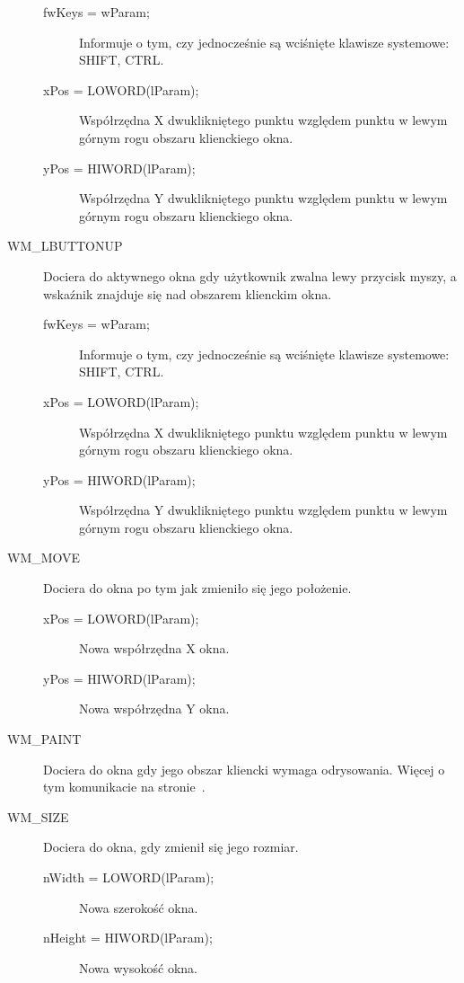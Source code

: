 \begin{description}
        \begin{description}
		\item[fwKeys = wParam;] Informuje o tym, czy jednocześnie są wciśnięte klawisze systemowe: SHIFT, CTRL.
		\item[xPos = LOWORD(lParam);] Współrzędna X dwuklikniętego punktu względem punktu w lewym górnym
			rogu obszaru klienckiego okna.
		\item[yPos = HIWORD(lParam);] Współrzędna Y dwuklikniętego punktu względem punktu w lewym górnym
			rogu obszaru klienckiego okna.
	\end{description}

\item[WM\_LBUTTONUP] Dociera do aktywnego okna gdy użytkownik zwalna lewy przycisk myszy, a wskaźnik znajduje
		się nad obszarem klienckim okna.

        \begin{description}
		\item[fwKeys = wParam;] Informuje o tym, czy jednocześnie są wciśnięte klawisze systemowe: SHIFT, CTRL.
		\item[xPos = LOWORD(lParam);] Współrzędna X dwuklikniętego punktu względem punktu w lewym górnym
			rogu obszaru klienckiego okna.
		\item[yPos = HIWORD(lParam);] Współrzędna Y dwuklikniętego punktu względem punktu w lewym górnym
			rogu obszaru klienckiego okna.
	\end{description}

\item[WM\_MOVE] Dociera do okna po tym jak zmieniło się jego położenie.

        \begin{description}
		\item[xPos = LOWORD(lParam);] Nowa współrzędna X okna.
		\item[yPos = HIWORD(lParam);] Nowa współrzędna Y okna.
	\end{description}

\item[WM\_PAINT] Dociera do okna gdy jego obszar kliencki wymaga odrysowania. Więcej o tym
		komunikacie na stronie~\pageref{subsection_gdi}.

\item[WM\_SIZE] Dociera do okna, gdy zmienił się jego rozmiar.

        \begin{description}
		\item[nWidth = LOWORD(lParam);] Nowa szerokość okna.
		\item[nHeight = HIWORD(lParam);] Nowa wysokość okna.
	\end{description}


\end{description}
